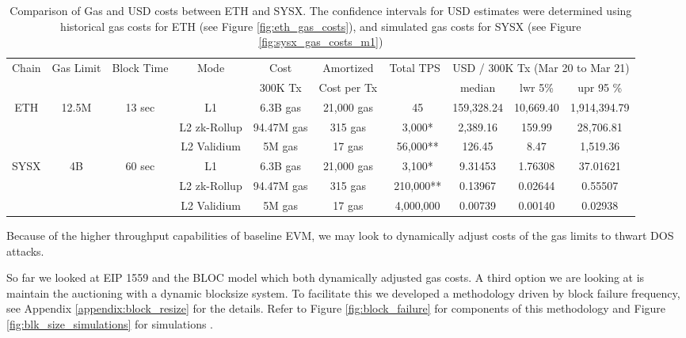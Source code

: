 \documentclass[peerreview]{ieeesyscoin}
\begin{document}
\begin{table}[h!]
\centering
\begin{tabular}{ |c|c|c|c|c|c|c|c|c|c|   } 
\hline
Chain & Gas  Limit & Block Time & Mode & Cost  & Amortized  & Total TPS & \multicolumn{3}{|c|}{USD / 300K Tx (Mar 20 to Mar 21) } \\
 &  &  &  &  300K Tx  & Cost per Tx  &  & median & lwr 5\% &  upr 95 \% \\ 
\hline
\multirow{3}{*}{ETH} & \multirow{3}{*}{12.5M} & \multirow{3}{*}{13 sec} & L1 & 6.3B gas  & 21,000 gas  & ~45 & 159,328.24 & 10,669.40  & 1,914,394.79  \\ 
\multirow{3}{*}{} & \multirow{3}{*}{} & \multirow{3}{*}{} & L2 zk-Rollup & 94.47M gas  & 315 gas & ~3,000* & 2,389.16 & 159.99  & 28,706.81 \\ 
\multirow{3}{*}{} & \multirow{3}{*}{} & \multirow{3}{*}{} & L2 Validium  & 5M gas  & 17 gas & ~56,000** & 126.45 & 8.47  & 1,519.36 \\ 
\hline

\multirow{3}{*}{SYSX} & \multirow{3}{*}{4B} & \multirow{3}{*}{60 sec} & L1 & 6.3B gas  & 21,000 gas  & ~3,100*& 9.31453 & 1.76308 & 37.01621 \\ 
\multirow{3}{*}{} & \multirow{3}{*}{} & \multirow{3}{*}{} & L2 zk-Rollup & 94.47M gas  & 315 gas & ~210,000** & 0.13967 & 0.02644  & 0.55507 \\ 
\multirow{3}{*}{} & \multirow{3}{*}{} & \multirow{3}{*}{} & L2 Validium  & 5M gas  & 17 gas & ~4,000,000 & 0.00739 & 0.00140  & 0.02938 \\ 
\hline

\end{tabular}
\caption{Comparison of Gas and USD costs between ETH and SYSX. The confidence intervals for USD estimates were determined using historical gas costs for ETH (see Figure \ref{fig:eth_gas_costs}), and simulated gas costs for SYSX (see Figure \ref{fig:sysx_gas_costs_m1})}
\label{table:gas_cost_estimates}
\end{table}

Because of the higher throughput capabilities of baseline EVM, we may look to dynamically adjust costs of the gas limits \cite{Che17} to thwart DOS attacks.

So far we looked at EIP 1559 and the BLOC model which both dynamically adjusted gas costs. A third option we are looking at is maintain the auctioning with a dynamic blocksize system. To facilitate this we developed a methodology driven by block failure frequency, see Appendix \ref{appendix:block_resize} for the details. Refer to Figure \ref{fig:block_failure} for components of this methodology and Figure \ref{fig:blk_size_simulations} for simulations .
\end{document}
